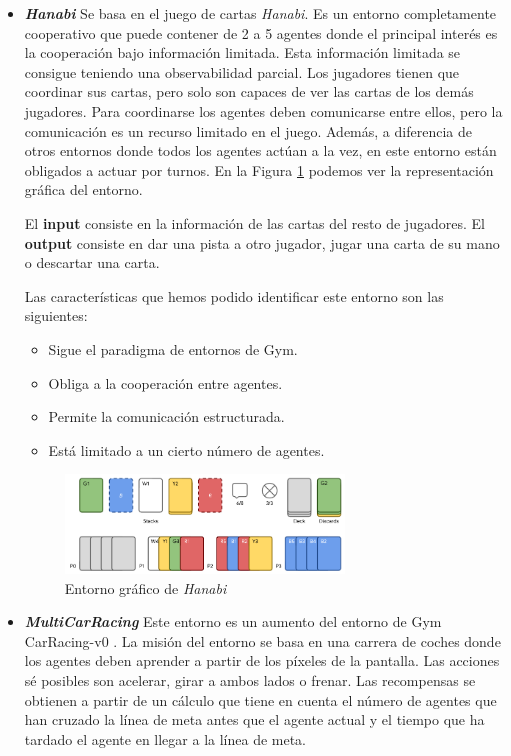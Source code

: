\begin{itemize}
	\item \textbf{\textit{Hanabi}} \cite{hanabi-repo} Se basa en el juego de cartas \textit{Hanabi}. Es un entorno completamente cooperativo que puede contener de 2 a 5 agentes donde el principal interés es la cooperación bajo información limitada. Esta información limitada se consigue teniendo una observabilidad parcial. Los jugadores tienen que coordinar sus cartas, pero solo son capaces de ver las cartas de los demás jugadores. Para coordinarse los agentes deben comunicarse entre ellos, pero la comunicación es un recurso limitado en el juego. Además, a diferencia de otros entornos donde todos los agentes actúan a la vez, en este entorno están obligados a actuar por turnos. En la Figura \ref {fig:hanabi} podemos ver la representación gráfica del entorno.

	      El \textbf{input} consiste en la información de las cartas del resto de jugadores. El \textbf{output} consiste en dar una pista a otro jugador, jugar una carta de su mano o descartar una carta.

	      Las características que hemos podido identificar este entorno son las siguientes:
	      \begin{itemize}
		      \item Sigue el paradigma de entornos de Gym.
		      \item Obliga a la cooperación entre agentes.
		      \item Permite la comunicación estructurada.
		      \item Está limitado a un cierto número de agentes.
	      \end{itemize}


	      \begin{figure}[ht]
		      \centering
		      \includegraphics[width=0.7\textwidth]{img/hanabi.png}
		      \caption{Entorno gráfico de \textit{Hanabi} \cite{env-list}}
		      \label{fig:hanabi}
	      \end{figure}

	\item \textbf{\textit{MultiCarRacing}} \cite{multicar-repo} Este entorno es un aumento del entorno de Gym CarRacing-v0 \cite {car-repo}. La misión del entorno se basa en una carrera de coches donde los agentes deben aprender a partir de los píxeles de la pantalla. Las acciones sé posibles son acelerar, girar a ambos lados o frenar. Las recompensas se obtienen a partir de un cálculo que tiene en cuenta el número de agentes que han cruzado la línea de meta antes que el agente actual y el tiempo que ha tardado el agente en llegar a la línea de meta.


\end{itemize}
